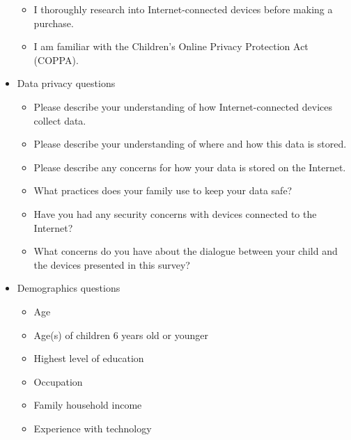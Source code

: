 \documentclass[12pt]{ucthesis}
\begin{document}
\begin{itemize}
\begin{itemize}
        \item I thoroughly research into Internet-connected devices before making a purchase.
        \item I am familiar with the Children’s Online Privacy Protection Act (COPPA).
    \end{itemize}
    \item Data privacy questions
    \begin{itemize}
        \item Please describe your understanding of how Internet-connected devices collect data. 
        \item Please describe your understanding of where and how this data is stored.
        \item Please describe any concerns for how your data is stored on the Internet.
        \item What practices does your family use to keep your data safe?
        \item Have you had any security concerns with devices connected to the Internet?
        \item What concerns do you have about the dialogue between your child and the devices presented in this survey?
    \end{itemize}
    \item Demographics questions
    \begin{itemize}
        \item Age 
        \item Age(s) of children 6 years old or younger
        \item Highest level of education
        \item Occupation
        \item Family household income
        \item Experience with technology
    \end{itemize}
  \end{itemize}
\end{document}

